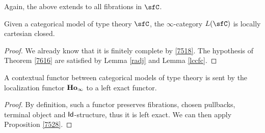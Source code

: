 Again, the above extends to all fibrations in $\sfC$.

\begin{thm}
  Given a categorical model of type theory $\sfC$, the $\infty$-category $L(\sfC)$
  is locally cartesian closed.
\end{thm}
\begin{proof}
  We already know that it is finitely complete by \ref{7518}. The hypothesis of
  Theorem \ref{7616} are satisfied by Lemma \ref{radj} and Lemma \ref{lccfc}.
\end{proof}

\begin{thm}
  A contextual functor between categorical models of type theory is sent by the
  localization functor $\operatorname{\mathbf{Ho}_\infty}$ to a left exact functor.
\end{thm}
\begin{proof}
  By definition, such a functor preserves fibrations, chosen pullbacks, terminal
  object and $\operatorname{\mathsf{Id}}$-structure, thus it is left exact. We can then apply
  Proposition \ref{7528}.
\end{proof}
